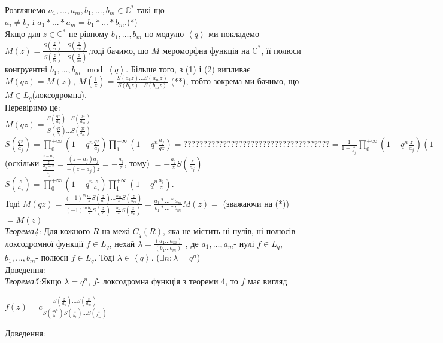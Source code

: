\documentclass[12pt,a4paper]{article}
\begin{document}
Розглянемо $a_{1},...,a_{m},b_{1},...,b_{m}\in \mathbb{C}^{*}$ такі що\\
 $a_{i}\neq b_{j}$ i $a_{1}*...*a_{m}=b_{1}*...*b_{m}$.(*)\\

Якщо для $z \in \mathbb{C}^{*}$ не рівному $b_{1},...,b_{m}$ по модулю $\left \langle q \right \rangle $ ми покладемо $M(z)=\frac{S(\frac{z}{a_{1}})...S(\frac{z}{a_{m}})}{S(\frac{z}{b_{1}})...S(\frac{z}{b_{m}})}$,тоді бачимо, що $M$ мероморфна функція на $\mathbb{C}^{*}$, її полюси конгруентні $b_{1},...,b_{m}\mod \left \langle q \right \rangle $. Більше того, з (1) і (2) випливає $M(qz)=M(z)$, $M(\frac{1}{z})=\frac{S(a_{1}z)...S(a_{m}z)}{S(b_{1}z)...S(b_{m}z)}$ (**), тобто зокрема ми бачимо, що $M\in L_{q}$(локсодромна).\\
Перевіримо це:\\
$M(qz)=\frac{S(\frac{qz}{a_{1}})...S(\frac{qz}{a_{m}})}{S(\frac{qz}{b_{1}})...S(\frac{qz}{b_{m}})}$\\
$S(\frac{qz}{a_{j}})= \prod_{0}^{+\infty } ( 1-q^{n}\frac{qz}{a_{j}} ) \prod_{1}^{+\infty }( 1-q^{n}\frac{a_{j}}{qz}) =?????????????????????????????????????= \frac{1}{1-\frac{z}{a_{j}}} \prod_{0}^{+\infty } ( 1-q^{n}\frac{z}{a_{j}}) (1-\frac{a_{j}}{z}) \prod_{1}^{+\infty }( 1-q^{n}\frac{a_{j}}{z})=$
(оскільки $ \frac{\frac{z-a_{j}}{z}}{\frac{a_{j}-z}{a_{j}}}= \frac{(z-a_{j})a_{j}}{-(z-a_{j})z}=-\frac{a_{j}}{z} $, тому)
$=-\frac{a_{j}}{z}S(\frac{z}{a_{j}})$\\
$S(\frac{z}{a_{j}})=  \prod_{0}^{+\infty } ( 1-q^{n}\frac{z}{a_{j}} ) \prod_{1}^{+\infty }( 1-q^{n}\frac{a_{j}}{z})$.\\
 Тодi
$M(qz)=\frac{ (-1)^{m} \frac{a_{1}}{z} S(\frac{z}{a_{1}})...\frac{a_{m}}{z} S(\frac{z}{a_{m}}) }{ (-1)^{m} \frac{b_{1}}{z} S(\frac{z}{b_{1}})...\frac{b_{m}}{z} S(\frac{z}{b_{m}}) }=\frac{ a_{1}*...*a_{m}}{b_{1}*...*b_{m}}M(z)=$ (зважаючи на (*)) $=M(z)$\\

\emph{Теорема4:} Для кожного $R$ на межі $C_{q}(R)$, яка не містить ні нулів, ні полюсів локсодромної функції $f\in L_{q}$, нехай $\lambda=\frac{(a_{1}...a_{m})}{(b_{1}...b_{m})}$ , де $a_{1},...,a_{m}$- нулі $f\in L_{q}$, $b_{1},...,b_{m}$- полюси $f\in L_{q}$. Тоді $\lambda\in \left \langle q \right \rangle$. ($ \exists n:\lambda =q^{n}$)\\
Доведення:
\\

\emph{Теорема5:}Якщо $\lambda =q^{n}$, $f$- локсодромна функція з теореми 4, то  $f$ має вигляд\\
 \begin{center}
 $f(z)= c\tfrac{S(\frac{z}{a_{1}})...S(\frac{z}{a_{m}})}{S(\frac{zq^{n}}{b_{1}})S(\frac{z}{b_{2}})...S(\frac{z}{b_{m}})}$
 \end{center}
Доведення:\\
\end{document}
